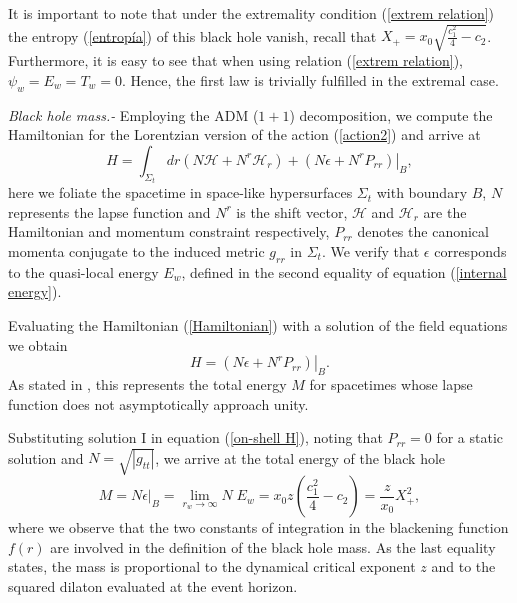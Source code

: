 \documentclass[sn-mathphys,Numbered]{sn-jnl}%
\theoremstyle{thmstyleone}%
\theoremstyle{thmstyletwo}%
\theoremstyle{thmstylethree}%
\begin{document}
It is important to note that under the extremality condition (\ref{extrem relation}) the entropy (\ref{entropía}) of this black hole vanish, recall that $X_+=x_0 \sqrt{\frac{c_1^2}{4}-c_2}$. Furthermore, it is easy to see that when using relation (\ref{extrem relation}), $\psi_w=E_w=T_w=0$. Hence, the first law is trivially fulfilled in the extremal case.


\textit{Black hole mass.-}
Employing the ADM ($1+1$) decomposition, we compute the Hamiltonian for the Lorentzian  version of the action (\ref{action2}) and arrive at
    \begin{equation}\label{Hamiltonian}
      H=\int_{\Sigma_t} d r\left(N \mathcal{H}+N^r \mathcal{H}_r\right)+\left.\left(N \epsilon +N^r P_{rr}\right)\right|_B,
    \end{equation}
%
 here we foliate the spacetime in space-like hypersurfaces $\Sigma_t$ with boundary $B$, $N$ represents the lapse function and $N^r$ is the shift vector, $\mathcal{H}$ and  $\mathcal{H}_r$ are the Hamiltonian and momentum constraint respectively, $P_{rr}$ denotes the canonical momenta conjugate to the induced metric $g_{rr}$ in $\Sigma_t$. We verify that $\epsilon$ corresponds to the quasi-local energy $E_w$, defined in the second equality of equation (\ref{internal energy}).
 
 Evaluating the Hamiltonian (\ref{Hamiltonian}) with a solution of the field equations we obtain 
%
 \begin{equation}\label{on-shell H}
      H=\left.\left(N \epsilon +N^r P_{rr}\right)\right|_B.
    \end{equation}
% 
As stated in \cite{Horowitz2}, this represents the total energy $M$ for spacetimes whose lapse function does not asymptotically approach unity.

Substituting solution I in equation (\ref{on-shell H}), noting that $P_{rr}=0$ for a static solution and $N=\sqrt{|g_{tt}|}$, we arrive at the total energy of the black hole
%
 \begin{equation}\label{M solI}
      M=N \epsilon \left. \right|_B= \lim_{r_w \rightarrow \infty} N\; E_w = x_0 z\left(\frac{c_1^2}{4}-c_2 \right)= \frac{z}{x_0} X_+^2,
    \end{equation}
%
where we observe that the two constants of integration in the blackening function $f(r)$ are involved in the definition of the black hole mass. As the last equality states, the mass is proportional to the dynamical critical exponent $z$ and to the squared dilaton evaluated at the event horizon.
\end{document}

